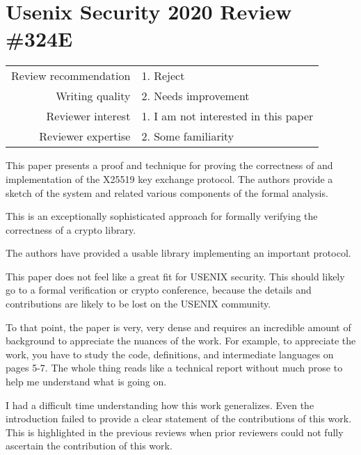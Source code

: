 \newpage
\section{Usenix Security 2020 Review \#324E}

\begin{tabular}{rl}
    \toprule
    Review recommendation & 1. Reject                            \\
    Writing quality       & 2. Needs improvement                 \\
    Reviewer interest     & 1. I am not interested in this paper \\
    Reviewer expertise    & 2. Some familiarity                  \\
    \bottomrule
\end{tabular}

\begin{center}
\end{center}
This paper presents a proof and technique for proving the correctness of and implementation of the X25519 key exchange protocol.  The authors provide a sketch of the system and related various components of the formal analysis.

\begin{center}
\end{center}
This is an exceptionally sophisticated approach for formally verifying the correctness of a crypto library.

The authors have provided a usable library implementing an important protocol.

\begin{center}
\end{center}
This paper does not feel like a great fit for USENIX security.   This should likely go to a formal verification or crypto conference, because the details and contributions are likely to be lost on the USENIX community.

To that point, the paper is very, very dense and requires an incredible amount of background to appreciate the nuances of the work.  For example, to appreciate the work, you have to study the code, definitions, and intermediate languages on pages 5-7.  The whole thing reads like a technical report without much prose to help me understand what is going on.

I had a difficult time understanding how this work generalizes. Even the introduction failed to provide a clear statement of the contributions of this work. This is highlighted in the previous reviews when prior reviewers could not fully ascertain the contribution of this work.

